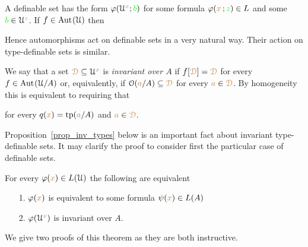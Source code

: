 \begin{remark}\label{rem_image_def_set}
  A definable set has the form $\varphi(\EuScript U^{\color{brown} x};{\color{green} b})$ for some formula $\varphi({\color{brown} x}\,;{\color{green} z})\in L$ and some ${\color{green} b}\in\EuScript U^{\color{green} z}$.
  If $f\in{\rm Aut\kern.15ex}(\EuScript U)$ then 




  Hence automorphisms act on definable sets in a very natural way. 
  Their action on type-definable sets is similar.
\end{remark}

We say that a set ${\color{brown}\EuScript D}\subseteq\EuScript U^{{\color{brown} x}}$ is \emph{invariant over $A$\/} if $f[{\color{brown}\EuScript D}]={\color{brown}\EuScript D}$ for every $f\in{\rm Aut\kern.15ex}(\EuScript U/A)$ or, equivalently, if $\EuScript O({\color{brown} a}/A)\subseteq {\color{brown}\EuScript D}$ for every ${\color{brown} a}\in {\color{brown}\EuScript D}$.
By homogeneity this is equivalent to requiring that 


for every $q({\color{brown} x})={\rm tp}({\color{brown} a}/A)$ and ${\color{brown} a}\in {\color{brown}\EuScript D}$.

Proposition~\ref{prop_inv_types} below is an important fact about invariant type-definable sets.
It may clarify the proof to consider first the particular case of definable sets.

\begin{proposition}\label{prop_inv_def}
For every $\varphi({\color{brown} x})\in L(\EuScript U)$ the following are equivalent
\begin{itemize}
 \item[1.] $\varphi({\color{brown} x})$ is equivalent to some formula $\psi({\color{brown} x})\in L(A)$
 \item[2.] $\varphi(\EuScript U^{\color{brown} x})$ is invariant over $A$.
\end{itemize}
\end{proposition}

We give two proofs of this theorem as they are both instructive.


